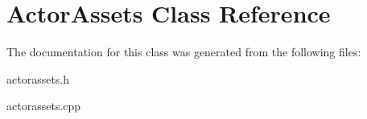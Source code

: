 \hypertarget{class_actor_assets}{}\section{Actor\+Assets Class Reference}
\label{class_actor_assets}


The documentation for this class was generated from the following files\+:\begin{DoxyCompactItemize}
\item 
actorassets.\+h\item 
actorassets.\+cpp\end{DoxyCompactItemize}
